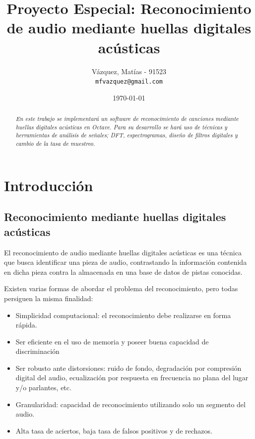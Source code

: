 \documentclass[10pt,spanish,a4paper,openany,notitlepage]{article}
\begin{document}
\title{\textbf{Proyecto Especial: Reconocimiento de audio mediante huellas digitales acústicas}}
\author{
  Vázquez, Matías - 91523\\
  \texttt{mfvazquez@gmail.com}
}
\date{\today}
\maketitle

\begin{abstract} %
\emph{En este trabajo se implementará un software de reconocimiento
de canciones mediante huellas digitales acústicas en Octave. Para su desarrollo
se hará uso de técnicas y herramientas de análisis de señales; 
DFT, espectrogramas, diseño de filtros digitales y cambio de la tasa
de muestreo.}
\end{abstract}

\section{Introducción}

\subsection{Reconocimiento mediante huellas digitales acústicas}

El reconocimiento de audio mediante huellas digitales acústicas es una técnica que busca
identificar una pieza de audio, contrastando la información contenida en dicha pieza contra
la almacenada en una base de datos de pistas conocidas.

Existen varias formas de abordar el problema del reconocimiento, pero todas persiguen la
misma finalidad:

\begin{itemize}
\item Simplicidad computacional: el reconocimiento debe realizarse en forma rápida.
\item Ser eficiente en el uso de memoria y poseer buena capacidad de discriminación
\item Ser robusto ante distorsiones: ruido de fondo, degradación por compresión digital del
audio, ecualización por respuesta en frecuencia no plana del lugar y/o parlantes, etc.
\item Granularidad: capacidad de reconocimiento utilizando solo un segmento del audio.
\item Alta tasa de aciertos, baja tasa de falsos positivos y de rechazos.
\end{itemize}
\end{document}
